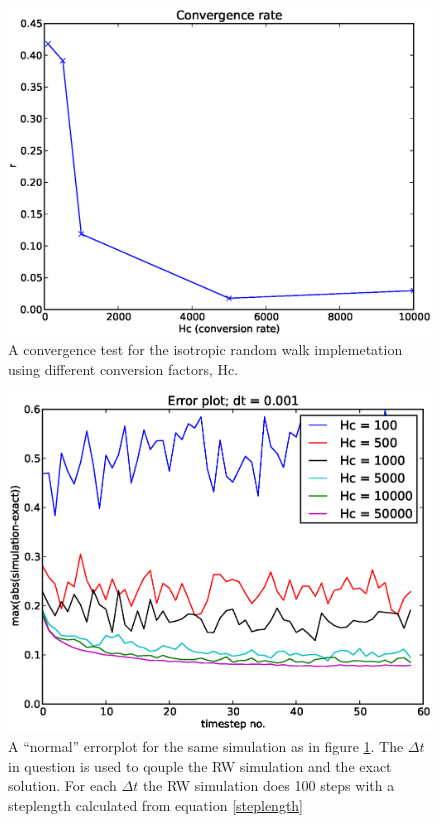 \begin{figure}[H]
 \centering
 \includegraphics[scale=0.7]{../doc/results/experiment_24112013_1525/resultsConvergenceTest.eps}
 \caption[Convergence test RW]{A convergence test for the isotropic random walk implemetation using different conversion factors, Hc.}
 \label{ConvergenceTestRW}
\end{figure}
\begin{figure}[H]
 \centering
 \includegraphics[scale=0.7]{../doc/results/experiment_24112013_1525/results/errorplot.eps}
 \caption[Errorplot RW]{A ``normal'' errorplot for the same simulation as in figure \ref{ConvergenceTestRW}. The $\Delta t$ in question is used to qouple the RW simulation and the exact solution. For each $\Delta t$ the RW simulation does 100 steps with a steplength calculated from equation \ref{steplength}}
\end{figure}

